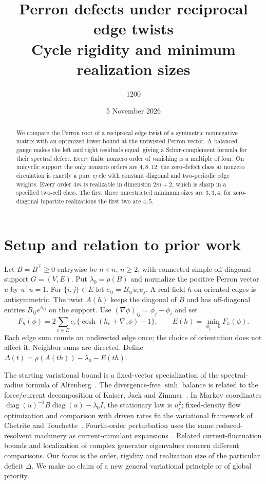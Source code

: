 \documentclass[11pt]{article}
\title{Perron defects under reciprocal edge twists\\
\large Cycle rigidity and minimum realization sizes}
\author{1200}
\date{5 November 2026}
\DeclareMathOperator{\diag}{diag}
\begin{document}
\maketitle
\begin{abstract}
We compare the Perron root of a reciprocal edge twist of a symmetric
nonnegative matrix with an optimized lower bound at the untwisted Perron
vector. A balanced gauge makes the left and right residuals equal, giving a
Schur-complement formula for their spectral defect. Every finite nonzero
order of vanishing is a multiple of four. On unicyclic support the only
nonzero orders are \(4,8,12\); the zero-defect class at nonzero circulation
is exactly a pure cycle with constant diagonal and two-periodic edge
weights. Every order \(4m\) is realizable in dimension \(2m+2\), which
is sharp in a specified two-cell class. The first three unrestricted
minimum sizes are \(3,3,4\); for zero-diagonal bipartite realizations the
first two are \(4,5\).
\end{abstract}

\section{Setup and relation to prior work}
Let \(B=B^\top\geq0\) entrywise be \(n\times n\), \(n\geq2\), with connected
simple off-diagonal support \(G=(V,E)\). Put \(\lambda_0=\rho(B)\) and
normalize the positive Perron vector \(u\) by \(u^\top u=1\). For
\(\{i,j\}\in E\) let \(c_{ij}=B_{ij}u_i u_j\). A real field \(h\) on
oriented edges is antisymmetric. The twist \(A(h)\) keeps the diagonal
of \(B\) and has off-diagonal entries \(B_{ij}e^{h_{ij}}\) on the support.
Use \((\nabla\phi)_{ij}=\phi_j-\phi_i\) and set
\begin{equation}
 F_h(\phi)=2\sum_{e\in E}c_e\{\cosh(h_e+\nabla_e\phi)-1\},\qquad
 E(h)=\min_{\phi_1=0} F_h(\phi).
 \label{eq:energy}
\end{equation}
Each edge sum counts an undirected edge once; the choice of orientation
does not affect it. Neighbor sums are directed. Define
\(\Delta(t)=\rho(A(th))-\lambda_0-E(th)\).

The starting variational bound is a fixed-vector specialization of the
spectral-radius formula of Altenberg~\cite{altenberg}. The divergence-free
\(\sinh\) balance is related to the force/current decomposition of
Kaiser, Jack and Zimmer~\cite{kaiser}. In Markov coordinates
\(\diag(u)^{-1}B\diag(u)-\lambda_0I\), the stationary law is \(u_i^2\);
fixed-density flow optimization and comparison with driven rates fit the
variational framework of Chetrite and Touchette~\cite[Appendix B]{chetrite}.
Fourth-order perturbation uses the same reduced-resolvent machinery as
current-cumulant expansions~\cite{baiesi}. Related current-fluctuation bounds
and localization of complex generator eigenvalues
\cite{pietzonka,kolchinsky} concern different comparisons. Our focus is the
order, rigidity and realization size of the particular deficit \(\Delta\).
We make no claim of a new general variational principle or of global priority.
\end{document}
